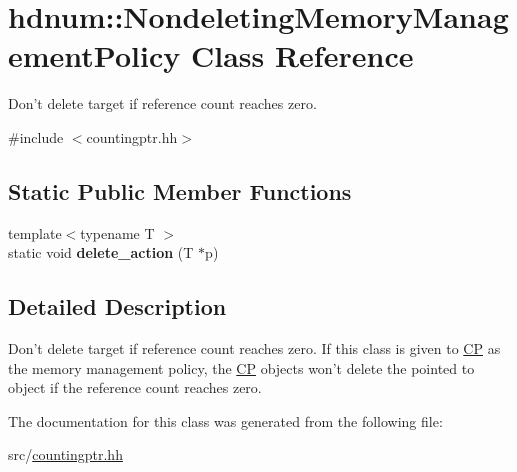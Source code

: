 \hypertarget{classhdnum_1_1NondeletingMemoryManagementPolicy}{
\section{hdnum::NondeletingMemoryManagementPolicy Class Reference}
\label{classhdnum_1_1NondeletingMemoryManagementPolicy}
}


Don't delete target if reference count reaches zero.  




{\ttfamily \#include $<$countingptr.hh$>$}

\subsection*{Static Public Member Functions}
\begin{DoxyCompactItemize}
\item 
\hypertarget{classhdnum_1_1NondeletingMemoryManagementPolicy_a52e5e801b0796943f7d06a341d8c1ab4}{
{\footnotesize template$<$typename T $>$ }\\static void {\bfseries delete\_\-action} (T $\ast$p)}
\label{classhdnum_1_1NondeletingMemoryManagementPolicy_a52e5e801b0796943f7d06a341d8c1ab4}

\end{DoxyCompactItemize}


\subsection{Detailed Description}
Don't delete target if reference count reaches zero. If this class is given to \hyperlink{classhdnum_1_1CP}{CP} as the memory management policy, the \hyperlink{classhdnum_1_1CP}{CP} objects won't delete the pointed to object if the reference count reaches zero. 

The documentation for this class was generated from the following file:\begin{DoxyCompactItemize}
\item 
src/\hyperlink{countingptr_8hh}{countingptr.hh}\end{DoxyCompactItemize}
